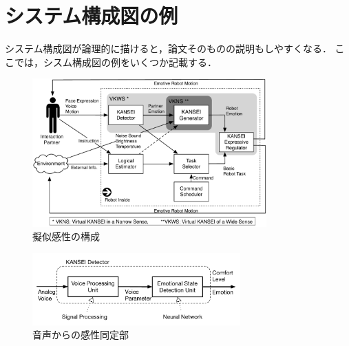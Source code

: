\documentclass[a4paper,10pt,twocolumn]{jsarticle}
\begin{document}
\section{システム構成図の例}
システム構成図が論理的に描けると，論文そのものの説明もしやすくなる．
ここでは，シスム構成図の例をいくつか記載する．
\begin{figure}[t]
  \centering
  \includegraphics[width=9cm]{VKall.pdf}
  \vspace{-7mm}
  \caption{擬似感性の構成}
  \label{fig:vkall}
  \vspace{5mm}
\end{figure}

\begin{figure}[t]
  \centering
  \includegraphics[width=8cm]{VoiceKANSEIDetector.pdf}
  \vspace{-7mm}
  \caption{音声からの感性同定部}
  \label{fig:VoiceKANSEIDetector}
  \vspace{5mm}
\end{figure}

%
\end{document}
